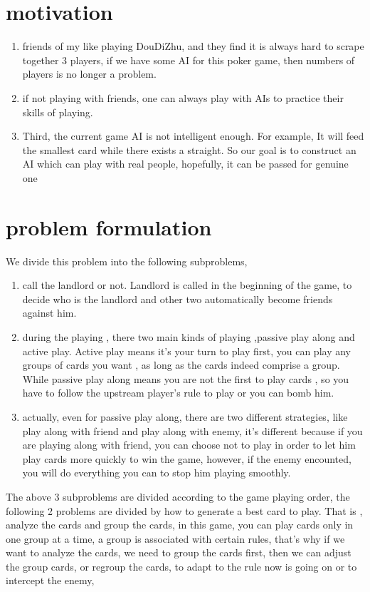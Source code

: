 \documentclass[a4paper,man,natbib]{apa6}
\begin{document}
\section{motivation}
\begin{enumerate}
\item friends of my like playing DouDiZhu, and they find it is always hard to scrape together 3 players, if we have some AI for this poker game, then numbers of players is no longer a problem. 
\item  if not playing with friends, one can always play with AIs to practice their skills of playing. 
\item  Third, the current game AI is not intelligent enough. For example, It will feed the smallest card while there exists a straight. So our goal is to construct an AI which can play with real people, hopefully, it can be passed for genuine one
\end{enumerate}

\section{problem formulation}
We divide this problem into the following subproblems, 
\begin{enumerate}
\item  call the landlord or not. Landlord is called in the beginning of the game, to decide who is the landlord and other two automatically become friends against him. 
\item  during the playing , there two main kinds of playing ,passive play along and active play. Active play means it’s your turn to play first, you can play any groups of cards you want , as long as the cards indeed comprise a group. While passive play along means you are not the first to play cards , so you have to follow the upstream player’s rule to play  or you can bomb him.
\item  actually, even for passive play along, there are two different strategies, like play along with friend and play along with enemy, it’s different because if you are playing along with friend, you can choose not to play in order to let him play cards more quickly to win the game, however, if the enemy encounted, you will do everything you can to stop him playing smoothly. 
\end{enumerate}
The above 3 subproblems are divided according to the game playing order, the following 2 problems are divided by how to generate a best card to play.
That is , analyze the cards and group the cards, in this game, you can play cards only in one group at a time, a group is associated with certain rules,  that’s why if we want to analyze the cards, we need to group the cards first, then we can adjust the group cards, or regroup the cards, to adapt to the rule now is going on or to  intercept the enemy,
\end{document}
